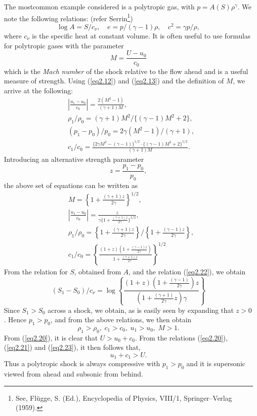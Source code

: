 The most\pageoriginale common example considered is a polytropic gas, with $p = A (S)\rho^\gamma$. We note the following relations: (refer Serrin\footnote{See, Fl\"ugge, S. (Ed.), Encyclopedia of Physics, VIII/1, Springer--Verlag (1959).})
$$
\log A = S/c_\nu, \quad e = p / (\gamma - 1) \rho, \quad c^2 = \gamma p / \rho, 
$$
where $c_\nu$ is the specific heat at constant volume. It is often useful to use formulas for polytropic gases with the parameter 
$$
M = \frac{U - u_0}{c_0}
$$
which is the {\em Mach number} of the shock relative to the flow ahead and is a useful measure of strength. Using (\ref{eq2.12}) and (\ref{eq2.13}) and the definition of $M$, we arrive at the following:
\begin{align*}
& |\frac{u_1 - u_0}{c_0}| = \frac{2(M^2 - 1)}{(\gamma +1)M}, \\
& \rho_1 / \rho_0 = (\gamma + 1) M^2 / \{(\gamma - 1) M^2 + 2\},\\
& (p_1 - p_0) / p_0 = 2 \gamma (M^2 -1) / (\gamma +1),\\
& c_1 / c_0 = \frac{\{2 \gamma M^2 - (\gamma -1)\}^{1/2} \cdot \{(\gamma -1) M^2 + 2\}^{1/2}}{(\gamma + 1)M}.
\end{align*}
Introducing an alternative strength parameter
$$
z = \frac{p_1 - p_0}{p_0}, 
$$
the above set of equations can be written as 
\begin{align*}
& M = \left\{1+\frac{(\gamma + 1)z}{2\gamma} \right\}^{1/2},
\tag{2.20}\label{eq2.20}\\
& |\frac{u_1 - u_0}{c_0}| = \frac{z}{\gamma \{1 + \frac{(\gamma +1)z}{2\gamma}\}^{1/2}}, \tag{2.21}\label{eq2.21}\\
& \rho_1 / \rho_0 =  \left\{1+ \frac{(\gamma + 1)z}{2\gamma} \right\} / \left\{1+ \frac{(\gamma -1)z}{2\gamma}  \right\}, \tag{2.22}\label{eq2.22}\\
& c_1 / c_0 = \left\{\frac{(1+z) (1+ \frac{(\gamma -1)z}{2\gamma})}{1+\frac{(\gamma + 1)z}{2\gamma}} \right\}^{1/2} \tag{2.23}\label{eq2.23}
\end{align*}\pageoriginale 
From the relation for $S$, obtained from $A$, and the relation (\ref{eq2.22}), we obtain
\begin{equation*}
(S_1 - S_0) / c_\nu = \log \left\{ \frac{(1+z) (1+ \frac{(\gamma -1)}{2\gamma})z}{(1+\frac{(\gamma +1)}{2\gamma} z)\gamma}\right\} \tag{2.24}\label{eq2.24}
\end{equation*}
Since $S_1 > S_0$ across a shock, we obtain, as is easily seen by expanding that $z>0$. Hence $p_1 > p_0$, and from the above relations, we then obtain
$$
\rho_1 > \rho_0 , \; c_1 > c_0, \; u_1 > u_0, \; M>1. 
$$
From (\ref{eq2.20}), it is clear that $U> u_0+c_0$. From the relations (\ref{eq2.20}), (\ref{eq2.21}) and (\ref{eq2.23}), it then follows that,
$$
u_1 + c_1 > U.
$$
Thus a polytropic shock is always compressive with $p_1>p_0$ and it is supersonic viewed from ahead and subsonic from behind.

